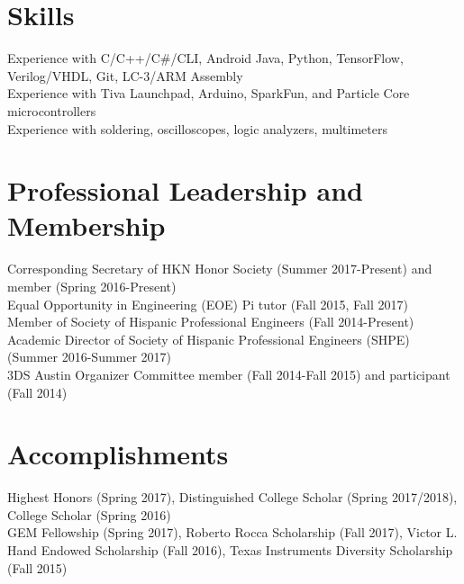 \documentclass[letter]{res}
\begin{document}
\begin{resume}
\vspace{-4mm}
 
\section{Skills}
Experience with C/C++/C\#/CLI, Android Java, Python, TensorFlow, Verilog/VHDL, Git, LC-3/ARM Assembly\\
Experience with Tiva Launchpad, Arduino, SparkFun, and Particle Core microcontrollers\\
Experience with soldering, oscilloscopes, logic analyzers, multimeters\\

\vspace{-8mm}

\section{Professional Leadership and Membership}
Corresponding Secretary of HKN Honor Society (Summer 2017-Present) and member (Spring 2016-Present)\\
Equal Opportunity in Engineering (EOE) Pi tutor (Fall 2015, Fall 2017)\\
Member of Society of Hispanic Professional Engineers (Fall 2014-Present)\\
Academic Director of Society of Hispanic Professional Engineers (SHPE) (Summer 2016-Summer 2017) \\
3DS Austin Organizer Committee member (Fall 2014-Fall 2015) and participant (Fall 2014)\\

\vspace{-8mm}

\section{Accomplishments} 
Highest Honors (Spring 2017), Distinguished College Scholar (Spring 2017/2018), College Scholar (Spring 2016)\\
GEM Fellowship (Spring 2017), Roberto Rocca Scholarship (Fall 2017), Victor L. Hand Endowed Scholarship (Fall 2016), Texas Instruments Diversity Scholarship (Fall 2015)\\

\end{resume}
\end{document}

